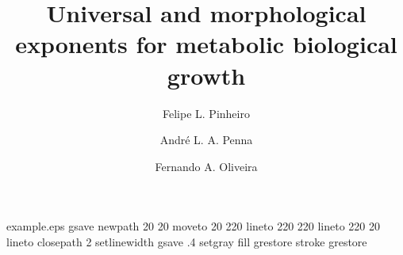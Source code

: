 %
%
%
%
%
\begin{filecontents*}{example.eps}
gsave
newpath
  20 20 moveto
  20 220 lineto
  220 220 lineto
  220 20 lineto
closepath
2 setlinewidth
gsave
  .4 setgray fill
grestore
stroke
grestore
\end{filecontents*}
%
\RequirePackage{fix-cm}
%
\documentclass[smallextended]{svjour3}       %
%
\smartqed  %
%
\usepackage{graphicx}
%
%
\usepackage{latexsym}
\usepackage{amsmath,amssymb}
\usepackage{amsmath}
\usepackage[T1]{fontenc}
%
%
%


\title{Universal and morphological exponents for metabolic biological growth }


\author{Felipe L. Pinheiro \and Andr\'{e} L. A. Penna \and Fernando A. Oliveira}


